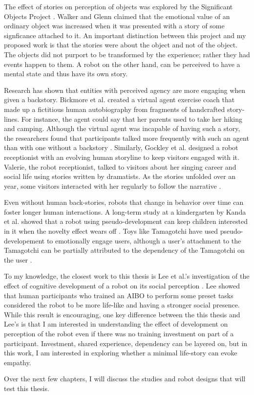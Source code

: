 The effect of stories on perception of objects was explored by the Significant Objects Project \cite{walker_significant_objects}. Walker and Glenn claimed that the emotional value of an ordinary object was increased when it was presented with a story of some signficance attached to it. An important distinction between this project and my proposed work is that the stories were about the object and not of the object. The objects did not purport to be transformed by the experience; rather they had events happen to them. A robot on the other hand, can be perceived to have a mental state and thus have its own story.

Research has shown that entities with perceived agency are more engaging when given a backstory. Bickmore et al. created a virtual agent exercise coach that made up a fictitious human autobiography from fragments of handcrafted story-lines. For instance, the agent could say that her parents used to take her hiking and camping. Although the virtual agent was incapable of having such a story, the researchers found that participants talked more frequently with such an agent than with one without a backstory \cite{bickmore_virtual_agent_autobiography}. Similarly, Gockley et al. designed a robot receptionist with an evolving human storyline to keep visitors engaged with it. Valerie, the robot receptionist, talked to visitors about her singing career and social life using stories written by dramatists. As the stories unfolded over an year, some visitors interacted with her regularly to follow the narrative \cite{gockley_valerie_roboreceptionist}. 

Even without human back-stories, robots that change in behavior over time can foster longer human interactions.  A long-term study at a kindergarten by Kanda et al. showed that a robot using pseudo-development can keep children interested in it when the novelty effect wears off \cite{kanda_long_term_robovie}. Toys like Tamagotchi have used pseudo-developement to emotionally engage users, although a user's attachment to the Tamagotchi can be partially attributed to the dependency of the Tamagotchi on the user \cite{kaplan_artificial_attachment}.

To my knowledge, the closest work to this thesis is Lee et al.'s investigation of the effect of cognitive development of a robot on its social perception \cite{lee_aibo_development_presence}. Lee showed that human participants who trained an AIBO to perform some preset tasks considered the robot to be more life-like and having a stronger social presence. While this result is encouraging, one key difference between the this thesis and Lee's is that I am interested in understanding the effect of development on perception of the robot even if there was no training investment on part of a participant. Investment, shared experience, dependency can be layered on, but in this work, I am interested in exploring whether a minimal life-story can evoke empathy.

Over the next few chapters, I will discuss the studies and robot designs that will test this thesis. 


